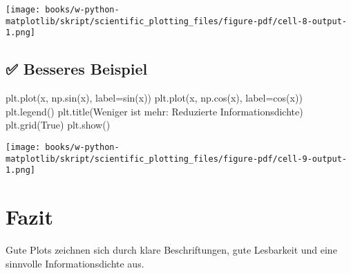 \documentclass[
  letterpaper,
  DIV=11,
  numbers=noendperiod]{scrreprt}
\newenvironment{Shaded}{\begin{snugshade}}{\end{snugshade}}
\newcommand{\NormalTok}[1]{\textcolor[rgb]{0.00,0.23,0.31}{#1}}
\newcommand{\OperatorTok}[1]{\textcolor[rgb]{0.37,0.37,0.37}{#1}}
\newcommand{\StringTok}[1]{\textcolor[rgb]{0.13,0.47,0.30}{#1}}
\newcommand{\VariableTok}[1]{\textcolor[rgb]{0.07,0.07,0.07}{#1}}
\begin{document}
\begin{tcolorbox}
\texttt{[image: books/w-python-matplotlib/skript/scientific\_plotting\_files/figure-pdf/cell-8-output-1.png]}

\subsection{✅ Besseres Beispiel}\label{besseres-beispiel-3}

\begin{Shaded}
\begin{Highlighting}[]
\NormalTok{plt.plot(x, np.sin(x), label}\OperatorTok{=}\StringTok{\textquotesingle{}sin(x)\textquotesingle{}}\NormalTok{)}
\NormalTok{plt.plot(x, np.cos(x), label}\OperatorTok{=}\StringTok{\textquotesingle{}cos(x)\textquotesingle{}}\NormalTok{)}
\NormalTok{plt.legend()}
\NormalTok{plt.title(}\StringTok{\textquotesingle{}Weniger ist mehr: Reduzierte Informationsdichte\textquotesingle{}}\NormalTok{)}
\NormalTok{plt.grid(}\VariableTok{True}\NormalTok{)}
\NormalTok{plt.show()}
\end{Highlighting}
\end{Shaded}

\texttt{[image: books/w-python-matplotlib/skript/scientific\_plotting\_files/figure-pdf/cell-9-output-1.png]}

\section{Fazit}\label{fazit-3}

Gute Plots zeichnen sich durch klare Beschriftungen, gute Lesbarkeit und
eine sinnvolle Informationsdichte aus.

\end{tcolorbox}
\end{document}
